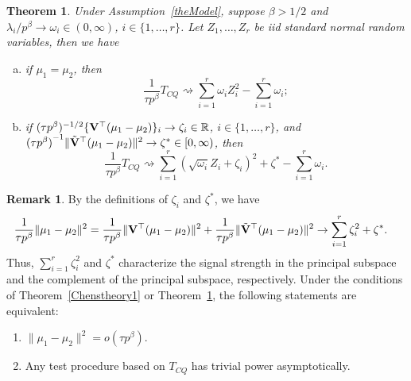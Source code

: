 \documentclass[times,sort&compress,3p]{elsarticle}
\theoremstyle{plain}
\newtheorem{theorem}{\quad\quad Theorem}
\theoremstyle{definition}
\newtheorem{remark}{\quad\quad Remark}
\theoremstyle{remark}
\begin{document}
\begin{theorem}\label{Chenstheory2}
 Under Assumption~\ref{theModel},
 suppose $\beta>1/2$ and $\lambda_i/p^\beta \to \omega_i\in(0,\infty)$, $i\in \{1,\ldots,r\}$.
    Let $Z_1,\ldots,Z_{r}$ be iid standard normal random variables,
     then we have
     \begin{enumerate}[(a)]
         \item
             if $\mu_1=\mu_2$, then
    $$
        \frac{1}{\tau p^{\beta}} T_{CQ}
        \rightsquigarrow
        \sum_{i=1}^r \omega_i Z_i^2
            -
        \sum_{i=1}^r \omega_i;
    $$
         \item
             if $(\tau p^{\beta})^{-1/2}\{\mathbf{V}^\top  (\mu_1-\mu_2)\}_i\to \zeta_i\in \mathbb{R}$, $i\in \{1,\ldots,r\}$,
             and
    ${(\tau p^\beta)}^{-1}\|\tilde{\mathbf{V}}^\top  (\mu_1-\mu_2)\|^2\to \zeta^*\in [0,\infty)$, then
    $$
        \frac{1}{\tau p^{\beta}} T_{CQ}
        \rightsquigarrow
        \sum_{i=1}^r (\sqrt{\omega_i} Z_i+\zeta_i)^2+
\zeta^*
        -
        \sum_{i=1}^r \omega_i.
    $$
     \end{enumerate}
\end{theorem}

\begin{remark}\label{remark1}
    By the definitions of $\zeta_i$ and $\zeta^*$, we have
    \begin{align*}
        &\frac{1}{\tau p^{\beta}}\|\mu_1-\mu_2\|^2
    =
    \frac{1}{\tau p^{\beta}}\|\mathbf{V}^\top  (\mu_1-\mu_2)\|^2
        +
        \frac{1}{\tau p^{\beta}}\|\tilde{\mathbf{V}}^\top  (\mu_1-\mu_2)\|^2
    \to \sum_{i=1}^r \zeta_i^2+ \zeta^*.
    \end{align*}
    Thus, $\sum_{i=1}^r\zeta_i^2$ and $\zeta^*$ characterize the signal strength in the principal subspace and the complement of the principal subspace, respectively.
    Under the conditions of Theorem~\ref{Chenstheory1} or Theorem~\ref{Chenstheory2}, the following statements are equivalent:
    \begin{enumerate}[(1)]
 \item
     $\|\mu_1-\mu_2\|^2=o(\tau p^{\beta})$.
        \item
            Any test procedure based on $T_{CQ}$ has trivial power asymptotically.
    \end{enumerate}
\end{remark}
\end{document}
